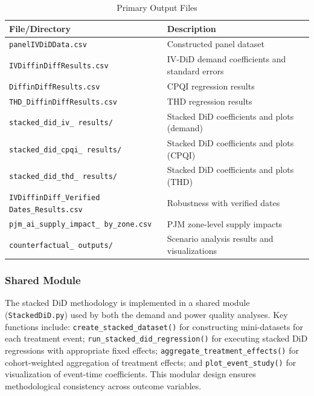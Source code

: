 \documentclass[sigconf]{acmart}
\begin{document}
\begin{table}[htbp]
\centering
\caption{Primary Output Files}
\label{tab:outputs}
\footnotesize %
\begin{tabularx}{\columnwidth}{@{} >{\raggedright\arraybackslash}X >{\raggedright\arraybackslash}X @{}}
\toprule
\textbf{File/Directory} & \textbf{Description} \\
\midrule
\texttt{panelIVDiDData.csv} & Constructed panel dataset \\
\texttt{IVDiffinDiffResults.csv} & IV-DiD demand coefficients and standard errors \\
\texttt{DiffinDiffResults.csv} & CPQI regression results \\
\texttt{THD\_DiffinDiffResults.csv} & THD regression results \\
\texttt{stacked\_did\_iv\_ \newline results/} & Stacked DiD coefficients and plots (demand) \\
\texttt{stacked\_did\_cpqi\_ \newline results/} & Stacked DiD coefficients and plots (CPQI) \\
\texttt{stacked\_did\_thd\_ \newline results/} & Stacked DiD coefficients and plots (THD) \\
\texttt{IVDiffinDiff\_Verified \newline Dates\_Results.csv} & Robustness with verified dates \\
\texttt{pjm\_ai\_supply\_impact\_ \newline by\_zone.csv} & PJM zone-level supply impacts \\
\texttt{counterfactual\_ \newline outputs/} & Scenario analysis results and visualizations \\
\bottomrule
\end{tabularx}
\end{table}

\subsubsection{Shared Module}
\label{appendix:shared}

The stacked DiD methodology is implemented in a shared module (\texttt{StackedDiD.py}) used by both the demand and power quality analyses. Key functions include: \texttt{create\_stacked\_dataset()} for constructing mini-datasets for each treatment event; \texttt{run\_stacked\_did\_regression()} for executing stacked DiD regressions with appropriate fixed effects; \texttt{aggregate\_treatment\_effects()} for cohort-weighted aggregation of treatment effects; and \texttt{plot\_event\_study()} for visualization of event-time coefficients. This modular design ensures methodological consistency across outcome variables.
\end{document}
